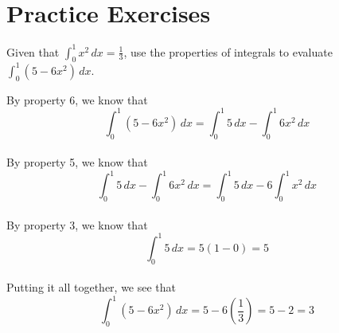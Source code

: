 \section{Practice Exercises}
\begin{Exercise}[label=defint2]
Given that $\int_{0}^{1}x^2\,dx=\frac{1}{3}$, use the properties of integrals to evaluate $\int_{0}^{1}(5-6x^2)\,dx$. 
\end{Exercise}

\begin{Answer}[ref=defint2]
By property 6, we know that $$\int_{0}^{1}(5-6x^2)\,dx=\int_{0}^{1}5\,dx-\int_{0}^{1}6x^2\,dx$$\\
By property 5, we know that $$\int_{0}^{1}5\,dx-\int_{0}^{1}6x^2\,dx=\int_{0}^{1}5\,dx-6\int_{0}^{1}x^2\,dx$$\\
By property 3, we know that $$\int_{0}^{1}5\,dx = 5(1-0) = 5$$\\
Putting it all together, we see that $$\int_{0}^{1}(5-6x^2)\,dx=5-6(\frac{1}{3})=5-2=3$$
\end{Answer}
